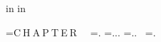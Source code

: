 \newtoks\LeftRunningHead
\newtoks\RightRunningHead
\def\TopLRPno {\headline{\ifnum\ChapIndicator=1 \hfil
  \else \ifodd\pageno \the\RightRunningHead\llap{\folio}\else
                      \rlap{\folio}\the\LeftRunningHead\fi \fi}
    \footline{\ifnum\ChapIndicator=1 \hfil\sevenrm\folio\hfil \else \hfil\fi}}


\newdimen\LMarginOdd    {} in
\newdimen\LMarginEven   {} in


\EveryChapter={C$\>$H$\>$A$\>$P$\>$T$\>$E$\>$R\ \ \the\ChapNo}
\EverySection={\the\ChapNo.\the\SectNo}
\EverySubSection={\the\ChapNo.\the\SectNo.\the\SubSectNo.}
\SemiLeftTitles
\TopLRPno
\RightRunningHead={\hfil\the\ChapNo.\the\SectNo.\ \the\SectionName\hfil}
\LeftRunningHead={\hfil\the\ChapNo.\ {\Smallcaps\the\ChapName}\hfil}
  
\OnFootnoterule{.8125in}

\endinput
